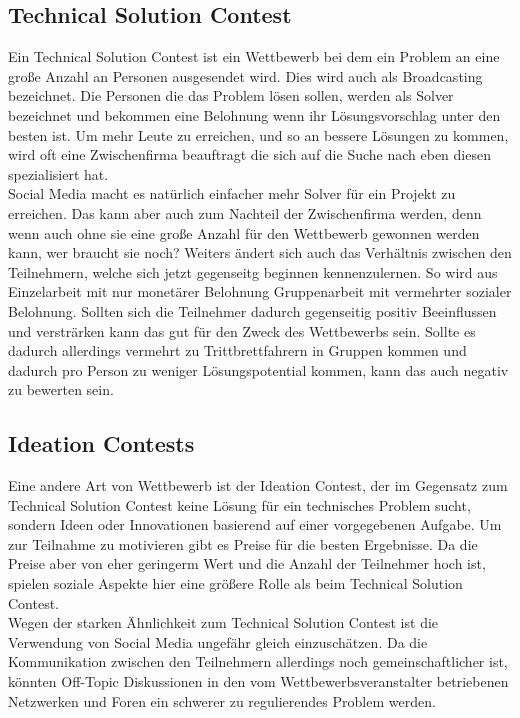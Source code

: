 \subsection{Technical Solution Contest}
Ein Technical Solution Contest ist ein Wettbewerb bei dem ein Problem an eine gro\ss{}e Anzahl an Personen ausgesendet wird. Dies wird auch als Broadcasting bezeichnet. Die Personen die das Problem l\"osen sollen, werden als Solver bezeichnet und bekommen eine Belohnung wenn ihr L\"osungsvorschlag unter den besten ist. Um mehr Leute zu erreichen, und so an bessere L\"osungen zu kommen, wird oft eine Zwischenfirma beauftragt die sich auf die Suche nach eben diesen spezialisiert hat.\\
Social Media macht es nat\"urlich einfacher mehr Solver f\"ur ein Projekt zu erreichen. Das kann aber auch zum Nachteil der Zwischenfirma werden, denn wenn auch ohne sie eine gro\ss{}e Anzahl f\"ur den Wettbewerb gewonnen werden kann, wer braucht sie noch? Weiters \"andert sich auch das Verh\"altnis zwischen den Teilnehmern, welche sich jetzt gegenseitg beginnen kennenzulernen. So wird aus Einzelarbeit mit nur monet\"arer Belohnung Gruppenarbeit mit vermehrter sozialer Belohnung. Sollten sich die Teilnehmer dadurch gegenseitig positiv Beeinflussen und verstr\"arken kann das gut f\"ur den Zweck des Wettbewerbs sein. Sollte es dadurch allerdings vermehrt zu Trittbrettfahrern in Gruppen kommen und dadurch pro Person zu weniger L\"osungspotential kommen, kann das auch negativ zu bewerten sein.
\subsection{Ideation Contests}
Eine andere Art von Wettbewerb ist der Ideation Contest, der im Gegensatz zum Technical Solution Contest keine L\"osung f\"ur ein technisches Problem sucht, sondern Ideen oder Innovationen basierend auf einer vorgegebenen Aufgabe. Um zur Teilnahme zu motivieren gibt es Preise f\"ur die besten Ergebnisse. Da die Preise aber von eher geringerm Wert und die Anzahl der Teilnehmer hoch ist, spielen soziale Aspekte hier eine gr\"o\ss{}ere Rolle als beim Technical Solution Contest.\\
Wegen der starken \"Ahnlichkeit zum  Technical Solution Contest ist die Verwendung von Social Media ungef\"ahr gleich einzusch\"atzen. Da die Kommunikation zwischen den Teilnehmern allerdings noch gemeinschaftlicher ist, k\"onnten Off-Topic Diskussionen in den vom Wettbewerbsveranstalter betriebenen Netzwerken und Foren ein schwerer zu regulierendes Problem werden.